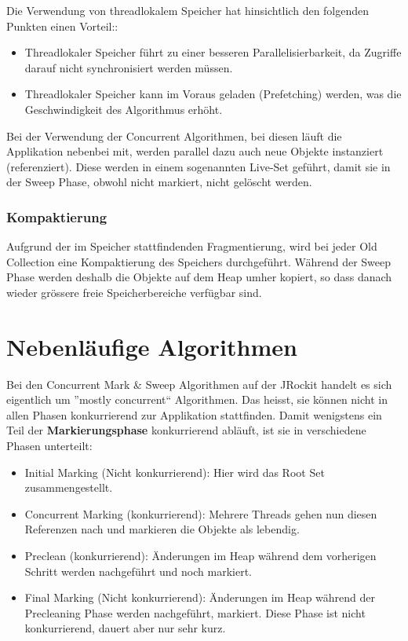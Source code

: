 Die Verwendung von threadlokalem Speicher hat hinsichtlich den folgenden Punkten einen Vorteil:\cite[S. 79]{lagergren2010oracle}:
\begin{itemize}
	\item Threadlokaler Speicher führt zu einer besseren Parallelisierbarkeit, da Zugriffe darauf nicht synchronisiert werden müssen.
	\item Threadlokaler Speicher kann im Voraus geladen (Prefetching) werden, was die Geschwindigkeit des Algorithmus erhöht.
\end{itemize}

Bei der Verwendung der Concurrent Algorithmen, bei diesen läuft die Applikation nebenbei mit, werden parallel dazu auch neue Objekte instanziert (referenziert). Diese werden in einem sogenannten Live-Set geführt, damit sie in der Sweep Phase, obwohl nicht markiert, nicht gelöscht werden.

\subsubsection{Kompaktierung}
Aufgrund der im Speicher stattfindenden Fragmentierung, wird bei jeder Old Collection eine Kompaktierung des Speichers durchgeführt. Während der Sweep Phase werden deshalb die Objekte auf dem Heap umher kopiert, so dass danach wieder grössere freie Speicherbereiche verfügbar sind.

\section{Nebenläufige Algorithmen}
Bei den Concurrent Mark \& Sweep Algorithmen auf der JRockit handelt es sich eigentlich um ''mostly concurrent`` Algorithmen. Das heisst, sie können nicht in allen Phasen konkurrierend zur Applikation stattfinden. Damit wenigstens ein Teil der \textbf{Markierungsphase} konkurrierend abläuft, ist sie in verschiedene Phasen unterteilt:
\begin{itemize}
	\item Initial Marking (Nicht konkurrierend): Hier wird das Root Set zusammengestellt.
	\item Concurrent Marking (konkurrierend): Mehrere Threads gehen nun diesen Referenzen nach und markieren die Objekte als lebendig.
	\item Preclean (konkurrierend): Änderungen im Heap während dem vorherigen Schritt werden nachgeführt und noch markiert.
	\item Final Marking (Nicht konkurrierend): Änderungen im Heap während der Precleaning Phase werden nachgeführt, markiert. Diese Phase ist nicht konkurrierend, dauert aber nur sehr kurz.
\end{itemize}

